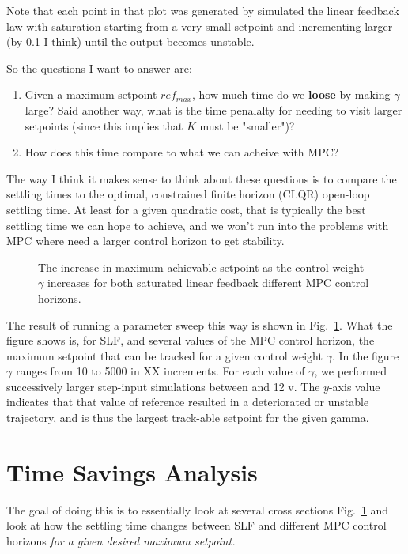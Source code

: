 \documentclass[journal,twocolumn,twoside]{IEEEtran}
\begin{document}
Note that each point in that plot was generated by simulated the linear feedback law with saturation starting from a very small setpoint and incrementing larger (by 0.1 I think) until the output becomes unstable. 

So the questions I want to answer are:
\begin{enumerate}
\item Given a maximum setpoint \(ref_{max}\), how much time do we \textbf{loose} by making \(\gamma\) large? Said another way, what is the time penalalty for needing to visit larger setpoints (since this implies that \(K\) must be "smaller")?
\item How does this time compare to what we can acheive with MPC?
\end{enumerate}


The way I think it makes sense to think about these questions is to compare the settling times to the optimal, constrained finite horizon (CLQR) open-loop settling time. At least for a given quadratic cost, that is typically the best settling time we can hope to achieve, and we won't run into the problems with MPC where need a larger control horizon to get stability. 

\begin{figure}
  
  \caption{The increase in maximum achievable setpoint as the control weight $\gamma$ increases for both saturated linear feedback different MPC control horizons.}
  \label{fig:maxsp_by_gam}
\end{figure}

The result of running a parameter sweep this way is shown in Fig.~\ref{fig:maxsp_by_gam}. What the figure shows is, for SLF, and several values of the MPC control horizon, the maximum setpoint that can be tracked for a given control weight $\gamma$. In the figure $\gamma$ ranges from 10 to 5000 in XX increments. For each value of $\gamma$, we performed successively larger step-input simulations between and 12 v. The $y$-axis value indicates that that value of reference resulted in a deteriorated or unstable trajectory, and is thus the largest track-able setpoint for the given gamma.

\section{Time Savings Analysis}\label{sec:time_save_analysis}
The goal of doing this is to essentially look at several cross sections Fig.~\ref{fig:maxsp_by_gam} and look at how the settling time changes between SLF and different MPC control horizons \emph{for a given desired maximum setpoint.}
\end{document}
